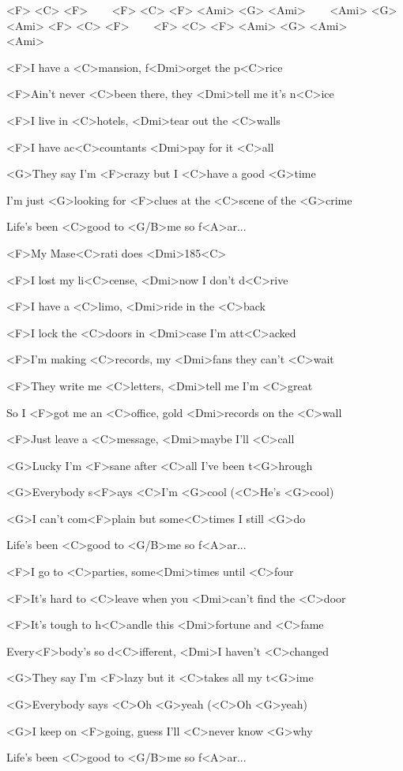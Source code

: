 

<F> <C> <F> ~~~ <F> <C> <F>
<Ami> <G> <Ami> ~~~ <Ami> <G> <Ami>
<F> <C> <F> ~~~ <F> <C> <F>
<Ami> <G> <Ami> ~~~ <Ami>

\zs
<F>I have a <C>mansion, f<Dmi>orget the p<C>rice

<F>Ain't never <C>been there, they <Dmi>tell me it's n<C>ice

<F>I live in <C>hotels, <Dmi>tear out the <C>walls

<F>I have ac<C>countants <Dmi>pay for it <C>all
\ks

\zr
<G>They say I'm <F>crazy but I <C>have a good <G>time

I'm just <G>looking for <F>clues at the <C>scene of the <G>crime

Life's been <C>good to <G/B>me so f<A>ar...
\kr

\zs
<F>My Mase<C>rati does <Dmi>185<C>

<F>I lost my li<C>cense, <Dmi>now I don't d<C>rive

<F>I have a <C>limo, <Dmi>ride in the <C>back

<F>I lock the <C>doors in <Dmi>case I'm att<C>acked
\ks

\zs
<F>I'm making <C>records, my <Dmi>fans they can't <C>wait

<F>They write me <C>letters, <Dmi>tell me I'm <C>great

So I <F>got me an <C>office, gold <Dmi>records on the <C>wall

<F>Just leave a <C>message, <Dmi>maybe I'll <C>call
\ks

\zs
<G>Lucky I'm <F>sane after <C>all I've been t<G>hrough

<G>Everybody s<F>ays <C>I'm <G>cool (<C>He's <G>cool)

<G>I can't com<F>plain but some<C>times I still <G>do

Life's been <C>good to <G/B>me so f<A>ar...
\ks

\zs
<F>I go to <C>parties, some<Dmi>times until <C>four

<F>It's hard to <C>leave when you <Dmi>can't find the <C>door

<F>It's tough to h<C>andle this <Dmi>fortune and <C>fame

Every<F>body's so d<C>ifferent, <Dmi>I haven't <C>changed
\ks

\zs
<G>They say I'm <F>lazy but it <C>takes all my t<G>ime

<G>Everybody says <C>Oh <G>yeah (<C>Oh <G>yeah)

<G>I keep on <F>going, guess I'll <C>never know <G>why

Life's been <C>good to <G/B>me so f<A>ar...
\ks

\kp
